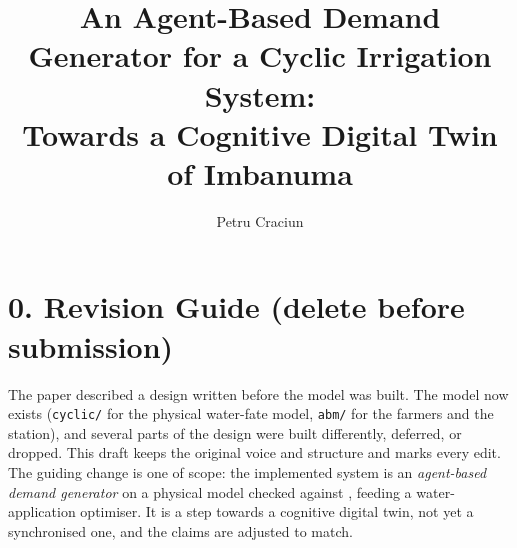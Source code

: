 \documentclass{article}
\title{An Agent-Based Demand Generator for a Cyclic Irrigation System:\\
Towards a Cognitive Digital Twin of Imbanuma}
\author{Petru Craciun}
\date{}
\begin{document}
\maketitle

\section*{0. Revision Guide (delete before submission)}
\begin{added}
The paper described a design written before the model was built. The model now exists
(\texttt{cyclic/} for the physical water-fate model, \texttt{abm/} for the farmers and the
station), and several parts of the design were built differently, deferred, or dropped. This
draft keeps the original voice and structure and marks every edit. The guiding change is one
of scope: the implemented system is an \emph{agent-based demand generator} on a physical model
checked against \cite{Okura2025WaterBalance}, feeding a water-application optimiser. It is a
step towards a cognitive digital twin, not yet a synchronised one, and the claims are adjusted
to match.


\end{added}
\end{document}
